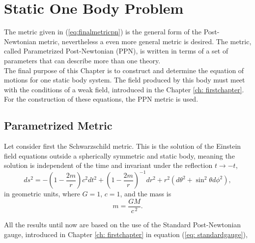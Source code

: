 \chapter{Static One Body Problem}\label{ch:chapter2}


The metric given in (\ref{eq:finalmetricpn}) is the general form of the Post-Newtonian metric, nevertheless a even more general metric is desired. The metric, called Parametrized Post-Newtonian (PPN), is written in terms of a set of parameters that can describe more than one theory. \\

The final purpose of this Chapter is to construct and determine the equation of motions for one static body system. The field produced by this body must meet with the conditions of a weak field, introduced in the Chapter \ref{ch: firstchapter}. For the construction of these equations, the PPN metric is used.\\

\section{Parametrized Metric}

Let consider first the Schwarzschild metric. This is the solution of the Einstein field equations outside a spherically symmetric and static body, meaning the solution is independent of the time and invariant under the reflection $t \rightarrow -t$,
\begin{equation}
\label{eq: Schwarzschild metric}
ds^2 = -\left(1-\frac{2m}{r}\right) c^2 dt^2 + \left(1-\frac{2m}{r}\right)^{-1} dr^2 + r^2 (d\theta^2 +\sin^2\theta d\phi^2),
\end{equation}
in geometric units, where $G = 1$, $c = 1$, and the mass is
\begin{equation}
m=\frac{GM}{c^{\,2}}.
\end{equation}



All the results until now are based on the use of the Standard Post-Newtonian gauge, introduced in Chapter \ref{ch: firstchapter} in equation (\ref{eq: standardgauge}),

